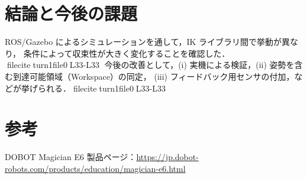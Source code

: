 \documentclass[a4paper,11pt]{ltjsarticle}
\begin{document}
\section{結論と今後の課題}
ROS/Gazebo によるシミュレーションを通して，IK ライブラリ間で挙動が異なり，
条件によって収束性が大きく変化することを確認した．fileciteturn1file0L33-L33
今後の改善として，(i) 実機による検証，(ii) 姿勢を含む到達可能領域（Workspace）の同定，
(iii) フィードバック用センサの付加，などが挙げられる．fileciteturn1file0L33-L33

\section*{参考}
DOBOT Magician E6 製品ページ：\url{https://jp.dobot-robots.com/products/education/magician-e6.html}
\end{document}
